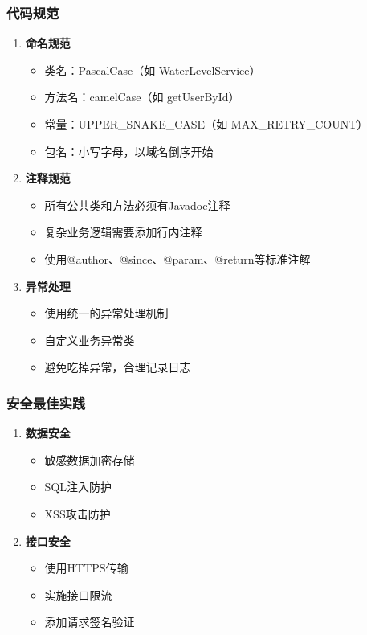 \subsubsection{代码规范}\label{ux4ee3ux7801ux89c4ux8303} \begin{enumerate} \def\labelenumi{\arabic{enumi}.} \item
\textbf{命名规范} \begin{itemize} \tightlist \item 类名：PascalCase（如 WaterLevelService） \item 方法名：camelCase（如 getUserById）
\item 常量：UPPER\_SNAKE\_CASE（如 MAX\_RETRY\_COUNT） \item 包名：小写字母，以域名倒序开始 \end{itemize} \item \textbf{注释规范} \begin{itemize}
\tightlist \item 所有公共类和方法必须有Javadoc注释 \item 复杂业务逻辑需要添加行内注释 \item 使用@author、@since、@param、@return等标准注解 \end{itemize}
\item \textbf{异常处理} \begin{itemize} \tightlist \item 使用统一的异常处理机制 \item 自定义业务异常类 \item 避免吃掉异常，合理记录日志 \end{itemize}
\end{enumerate} \subsubsection{安全最佳实践}\label{ux5b89ux5168ux6700ux4f73ux5b9eux8df5} \begin{enumerate}
\def\labelenumi{\arabic{enumi}.} \item \textbf{数据安全} \begin{itemize} \tightlist \item 敏感数据加密存储 \item SQL注入防护 \item
XSS攻击防护 \end{itemize} \item \textbf{接口安全} \begin{itemize} \tightlist \item 使用HTTPS传输 \item 实施接口限流 \item 添加请求签名验证

\end{itemize}
\end{enumerate}
